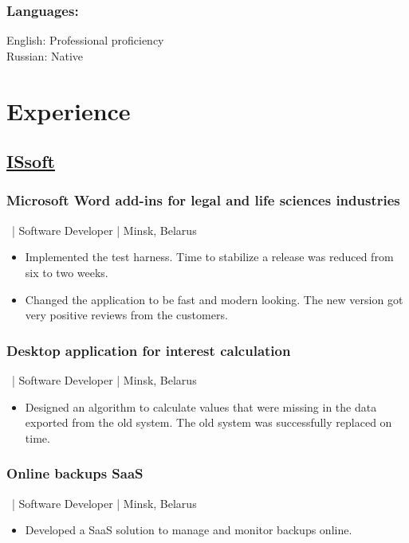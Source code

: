 \documentclass[a4paper,11pt]{article}
\newcommand{\periodandlocation}[1]{{\small #1}}
\begin{document}
\begin{minipage}[t]{0.34\textwidth}
    \subsubsection*{Languages:}
    English: Professional proficiency\\
    Russian: Native
  \end{minipage}
  \hfil
  \begin{minipage}[t]{0.55\textwidth}
    \section*{Experience}
    \subsection*{\href{http://www.issoft.by/}{ISsoft}}
	\subsubsection*{Microsoft Word add-ins for legal and life sciences industries}
    \periodandlocation{\ | Software Developer | Minsk, Belarus}
    \begin{itemize}
      \item Implemented the test harness. Time to stabilize a release was reduced from six to two weeks.
      \item Changed the application to be fast and modern looking. The new version got very positive reviews from the customers.
    \end{itemize}
	\subsubsection*{Desktop application for interest calculation}
    \periodandlocation{\ | Software Developer | Minsk, Belarus}
	\begin{itemize}
      \item Designed an algorithm to calculate values that were missing in the data exported from the old system. The old system was successfully replaced on time.
    \end{itemize}
	\subsubsection*{Online backups SaaS}
	\periodandlocation{\ | Software Developer | Minsk, Belarus}
    \begin{itemize}
      \item Developed a SaaS solution to manage and monitor backups online.
    \end{itemize}

\end{minipage}
\end{document}
